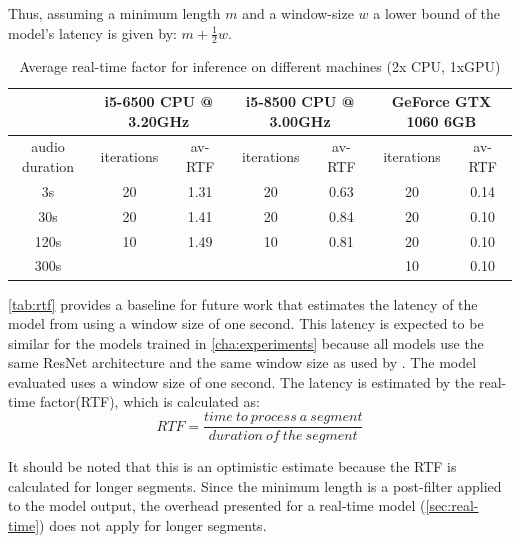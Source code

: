 \documentclass[bsc,frontabs,parskip,deptreport]{infthesis}
\begin{document}
Thus, assuming a minimum length $m$ and a window-size $w$ a lower bound of the model's latency is given by: $m + \frac{1}{2}w$.

\begin{table}[h!]
    \hspace{-2cm}
    \begin{tabular}{|c|c|c|c|c|c|c|}
    \hline
    & \multicolumn{2}{|c|}{i5-6500 CPU @ 3.20GHz} &
    \multicolumn{2}{|c|}{i5-8500 CPU @ 3.00GHz} & 
    \multicolumn{2}{|c|}{GeForce GTX 1060 6GB} \\ 
    \hline
    audio duration & iterations & av-RTF &
    iterations & av-RTF & iterations & av-RTF \\
    \hline
    3s & 20 & 1.31   & 20 & 0.63  & 20 & 0.14  \\
    30s & 20 & 1.41  & 20 & 0.84  & 20 & 0.10 \\
    120s & 10 & 1.49 &  10 & 0.81  & 20 & 0.10 \\
    300s &&&&                     & 10 & 0.10 \\
    \hline
    \end{tabular}
    \caption{Average real-time factor for inference on different machines (2x CPU, 1xGPU)}
    \label{tab:rtf}
\end{table}

\autoref{tab:rtf} provides a baseline for future work that estimates the latency of the model from \citet{gillick2021robust} using a window size of one second. This latency is expected to be similar for the models trained in \autoref{cha:experiments} because all models use the same ResNet architecture and the same window size as used by \citet{gillick2021robust}. 
The model evaluated uses a window size of one second. 
The latency is estimated by the real-time factor(RTF), which is calculated as: 
$$ RTF = \frac{time\ to\ process\ a\ segment}{duration\ of\ the\ segment} $$

It should be noted that this is an optimistic estimate because the RTF is calculated for longer segments.
Since the minimum length is a post-filter applied to the model output, the overhead presented for a real-time model (\autoref{sec:real-time}) does not apply for longer segments. 
\end{document}
